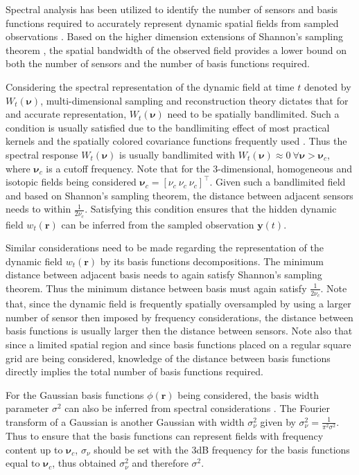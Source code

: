 \documentclass[onecolumn,draftcls]{IEEEtran}
\begin{document}
Spectral analysis has been utilized to identify the number of sensors and basis functions required to accurately represent dynamic spatial fields from sampled observations \cite{Sanner1992,Scerri2009}. Based on the higher dimension extensions of Shannon's sampling theorem \cite{Peterson1962}, the spatial bandwidth of the observed field provides a lower bound on both the number of sensors and the number of basis functions required.  

Considering the spectral representation of the dynamic field at time $t$ denoted by $W_t(\boldsymbol{\nu})$, multi-dimensional sampling and reconstruction theory dictates that for and accurate representation, $W_t(\boldsymbol{\nu})$ need to be spatially bandlimited. Such a condition is usually satisfied due to the bandlimiting effect of most practical kernels and the spatially colored covariance functions frequently used \cite{some eeg literature here}. Thus the spectral response $W_t(\boldsymbol{\nu})$ is usually bandlimited with $W_t(\boldsymbol{\nu}) \approx 0 ~ \forall \boldsymbol{\nu} > \boldsymbol{\nu}_c$, where $\boldsymbol{\nu}_c$ is a cutoff frequency. Note that for the 3-dimensional, homogeneous and isotopic fields being considered $\boldsymbol{\nu}_c = [\nu_c ~ \nu_c ~ \nu_c]^\top$. Given such a bandlimited field and based on Shannon's sampling theorem, the distance between adjacent sensors needs to within $\frac{1}{2\nu_c}$. Satisfying this condition ensures that the hidden dynamic field $w_t(\mathbf{r})$ can be inferred from the sampled observation $\mathbf{y}(t)$.

Similar considerations need to be made regarding the representation of the dynamic field $w_t(\mathbf{r})$ by its basis functions decompositions. The minimum distance between adjacent basis needs to again satisfy Shannon's sampling theorem. Thus the minimum distance between basis must again satisfy $\frac{1}{2\nu_c}$. Note that, since the dynamic field is frequently spatially oversampled by using a larger number of sensor then imposed by frequency considerations, the distance between basis functions is usually larger then the distance between sensors. Note also that since a limited spatial region and since basis functions placed on a regular square grid are being considered, knowledge of the distance between basis functions directly implies the total number of basis functions required. 

For the Gaussian basis functions $\phi(\mathbf{r})$ being considered, the basis width parameter $\sigma^2$ can also be inferred from spectral considerations \cite{Sanner1992,Scerri2009}. The Fourier transform of a Gaussian is another Gaussian with width $\sigma^2_{\nu}$ given by $\sigma^2_{\nu} = \frac{1}{\pi^2\sigma^2}$. Thus to ensure that the basis functions can represent fields with frequency content up to $\boldsymbol{\nu}_c$, $\sigma_{\nu}$ should be set with the 3dB frequency for the basis functions equal to $\boldsymbol{\nu}_c$, thus obtained $\sigma^2_{\nu}$ and therefore $\sigma^2$. 
\end{document}
